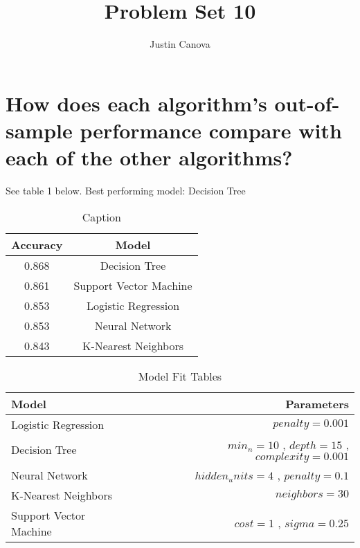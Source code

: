 \documentclass{article}
\title{Problem Set 10}
\author{Justin Canova}
\begin{document}
\maketitle
\section{ How does each algorithm’s out-of-sample performance compare
with each of the other algorithms?}
See table 1 below.
Best performing model: Decision Tree

\begin{table}
    \centering
    \begin{tabular}{c|c}
      Accuracy & Model \\\hline
        0.868 & Decision Tree    \\     
         0.861 & Support Vector Machine \\
   0.853 & Logistic Regression   \\
   0.853 & Neural Network        \\
    0.843 & K-Nearest Neighbors   \\
    \end{tabular}
    \caption{Caption}
    \label{tab:my_label}
    \end{table}

\begin{table}
\centering
\begin{tabular}{l|r}
Model & Parameters \\\hline
Logistic Regression & $penalty = 0.001$ \\
Decision Tree & $min_n = 10$ , $depth = 15$ , $complexity = 0.001$\\
Neural Network & $hidden_units = 4$ , $penalty = 0.1$\\
K-Nearest Neighbors & $neighbors = 30$\\
Support Vector Machine & $cost = 1$ , $sigma = 0.25$

\end{tabular}
\caption{\label{tab:widgets}Model Fit Tables}
\end{table}
\end{document}
